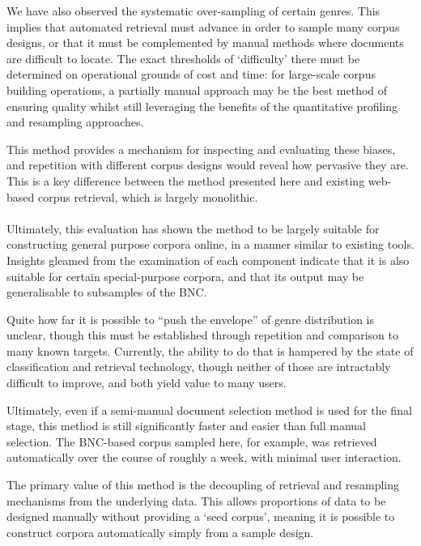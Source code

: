 We have also observed the systematic over-sampling of certain genres.  This implies that automated retrieval must advance in order to sample many corpus designs, or that it must be complemented by manual methods where documents are difficult to locate.  The exact thresholds of `difficulty' there must be determined on operational grounds of cost and time: for large-scale corpus building operations, a partially manual approach may be the best method of ensuring quality whilst still leveraging the benefits of the quantitative profiling and resampling approaches.

This method provides a mechanism for inspecting and evaluating these biases, and repetition with different corpus designs would reveal how pervasive they are.  This is a key difference between the method presented here and existing web-based corpus retrieval, which is largely monolithic.

\paragraph{}

Ultimately, this evaluation has shown the method to be largely suitable for constructing general purpose corpora online, in a manner similar to existing tools.  Insights gleamed from the examination of each component indicate that it is also suitable for certain special-purpose corpora, and that its output may be generalisable to subsamples of the BNC.

Quite how far it is possible to ``push the envelope'' of genre distribution is unclear, though this must be established through repetition and comparison to many known targets.  Currently, the ability to do that is hampered by the state of classification and retrieval technology, though neither of those are intractably difficult to improve, and both yield value to many users.

Ultimately, even if a semi-manual document selection method is used for the final stage, this method is still significantly faster and easier than full manual selection.  The BNC-based corpus sampled here, for example, was retrieved automatically over the course of roughly a week, with minimal user interaction.

The primary value of this method is the decoupling of retrieval and resampling mechanisms from the underlying data.  This allows proportions of data to be designed manually without providing a `seed corpus', meaning it is possible to construct corpora automatically simply from a sample design.




